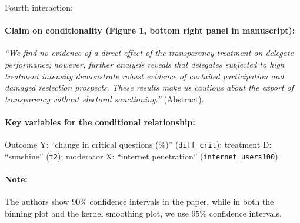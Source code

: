 \documentclass[12pt]{article}
\begin{document}
\clearpage

\noindent Fourth interaction:

\paragraph{Claim on conditionality (Figure 1, bottom right panel in manuscript):} \emph{``We find no evidence of a direct effect of the transparency treatment on delegate performance; however,
further analysis reveals that delegates subjected to high treatment intensity demonstrate robust evidence of curtailed participation and damaged reelection prospects. These results make us cautious about the export of transparency without electoral sanctioning.''} (Abstract). 


\paragraph{Key variables for the conditional relationship:} Outcome Y:
``change in critical questions (\%)'' (\texttt{diff\_crit}); treatment D: ``sunshine'' (\texttt{t2}); moderator X: ``internet penetration''
(\texttt{internet\_users100}).

\paragraph{Note:} The authors show 90\% confidence intervals in the paper, while in both the binning plot and the kernel smoothing plot, we use 95\% confidence intervals.

\newpage
\end{document}
